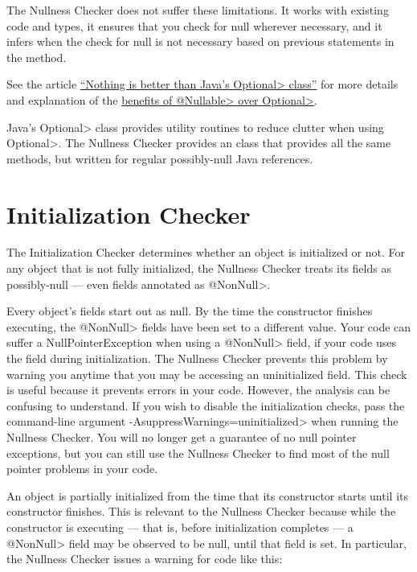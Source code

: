 The Nullness Checker does not suffer these limitations.  It works with
existing code and types, it ensures that you check for null wherever
necessary, and it infers when the check for null is not necessary based on
previous statements in the method.

See the article
\href{http://homes.cs.washington.edu/~mernst/advice/nothing-is-better-than-optional.html}{``Nothing
  is better than Java's \<Optional> class''} for more details and
explanation of the
\href{http://homes.cs.washington.edu/~mernst/advice/nothing-is-better-than-optional.html#benefits-of-nullable}{benefits of \<@Nullable> over \<Optional>}.

Java's \<Optional> class provides utility routines to reduce clutter when
using \<Optional>.  The Nullness Checker provides an
 class that provides all the same methods,
but written for regular possibly-null Java references.


\section{Initialization Checker\label{initialization-checker}}

The Initialization Checker determines whether an object is initialized or
not.  For any object that is not fully initialized, the Nullness Checker
treats its fields as possibly-null --- even fields annotated as
\<@NonNull>.

Every object's fields start out as null.  By the time the constructor
finishes executing, the \<@NonNull> fields have been set to a different
value.  Your code can suffer a NullPointerException when using a
\<@NonNull> field, if your code uses the field during initialization.
The Nullness Checker prevents this problem by warning you anytime that you
may be accessing an uninitialized field.  This check is useful because it
prevents errors in your code.  However, the analysis can be confusing to
understand.  If you wish to disable the initialization checks, pass the
command-line argument \<-AsuppressWarnings=uninitialized> when running the
Nullness Checker.  You will no longer get a guarantee of no null pointer
exceptions, but you can still use the Nullness Checker to find most of the
null pointer problems in your code.


An object is partially initialized from the time that its constructor starts until its constructor
finishes.  This is relevant to the Nullness Checker because while the
constructor is executing --- that is, before initialization completes ---
a \<@NonNull>
field may be observed to be null, until that field is set.  In
particular, the Nullness Checker issues a warning for code like this:

